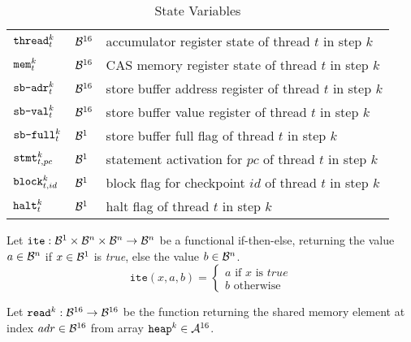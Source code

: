 \begin{table}[h!]
\begin{tabular}{lll}
  \hline
  $\THREAD^k_t$ & $\BVSORT$ & accumulator register state of thread $t$ in step $k$ \\
  $\MEM^k_t$ & $\BVSORT$ & CAS memory register state of thread $t$ in step $k$ \\
  $\SBADR^k_t$ & $\BVSORT$ & store buffer address register of thread $t$ in step $k$ \\
  $\SBVAL^k_t$ & $\BVSORT$ & store buffer value register of thread $t$ in step $k$ \\
  $\SBFULL^k_t$ & $\BVSORT[1]$ & store buffer full flag of thread $t$ in step $k$ \\
  $\STMT^k_{t, pc}$ & $\BVSORT[1]$ & statement activation for $pc$ of thread $t$ in step $k$ \\
  $\BLOCK^k_{t, id}$ & $\BVSORT[1]$ & block flag for checkpoint $id$ of thread $t$ in step $k$ \\
  $\HALT^k_t$ & $\BVSORT[1]$ & halt flag of thread $t$ in step $k$ \\
  \hline
\end{tabular}
\caption{State Variables}
\end{table}


\newcommand{\ITE}{\texttt{ite}}
\newcommand{\ITEindent}{\;\;\;\;\;\;\;}

Let $\ITE: \BVSORT[1] \times \BVSORT[n] \times \BVSORT[n] \to \BVSORT[n]$ be a functional if-then-else, returning the value $a \in \BVSORT[n]$ if $x \in \BVSORT[1]$ is \emph{true}, else the value $b \in \BVSORT[n]$.
\[
  \ITE(x, a, b) =
  \begin{cases}
    a \text{ if } x \text{ is } true \\
    b \text{ otherwise}
  \end{cases}
\]

\newcommand{\READ}{\texttt{read}}

Let $\READ^k: \BVSORT \to \BVSORT$ be the function returning the shared memory element at index $adr \in \BVSORT$ from array $\HEAP^k \in \ASORT$.

~\\

\newcommand{\LOAD}{\texttt{load}}

